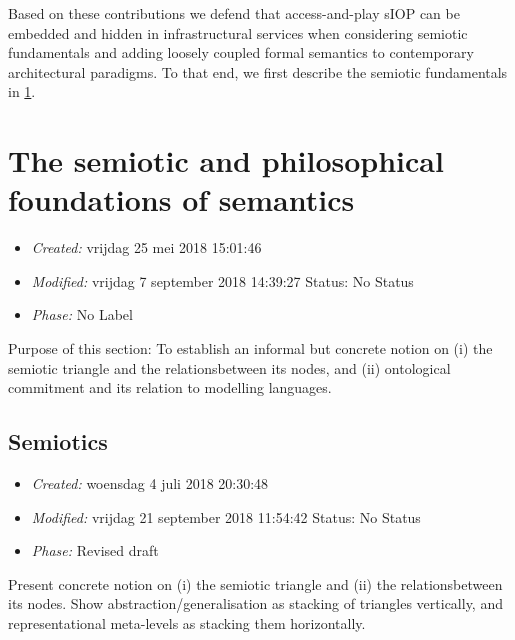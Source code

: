 \documentclass[a4paper,11pt,oneside,oldfontcommands]{memoir}
\newcounter{para}
\theoremstyle{definition}
\theoremstyle{break}		%
\numberwithin{equation}{chapter}
\numberwithin{figure}{chapter}
\begin{document}
Based on these contributions we defend that access-and-play sIOP can be
embedded and hidden in infrastructural services when considering
semiotic fundamentals and adding loosely coupled formal semantics to
contemporary architectural paradigms. To that end, we first describe the
semiotic fundamentals in
\cref{the-semiotic-and-philosophical-foundations-of-semantics}.

\hypertarget{the-semiotic-and-philosophical-foundations-of-semantics}{%
\chapter{The semiotic and philosophical foundations of
semantics}\label{the-semiotic-and-philosophical-foundations-of-semantics}}

\begin{itemize}
\tightlist
\item
  \emph{Created:} vrijdag 25 mei 2018 15:01:46
\item
  \emph{Modified:} vrijdag 7 september 2018 14:39:27 Status: No Status
\item
  \emph{Phase:} No Label
\end{itemize}

\begin{synopsis}
Purpose of this section: To establish an informal but concrete notion on (i) the semiotic triangle and the relationsbetween its nodes, and (ii) ontological commitment and its relation to modelling languages.

\end{synopsis}

\hypertarget{semiotics}{%
\section{Semiotics}\label{semiotics}}

\begin{itemize}
\tightlist
\item
  \emph{Created:} woensdag 4 juli 2018 20:30:48
\item
  \emph{Modified:} vrijdag 21 september 2018 11:54:42 Status: No Status
\item
  \emph{Phase:} Revised draft
\end{itemize}

\begin{synopsis}
Present concrete notion on (i) the semiotic triangle and (ii) the relationsbetween its nodes.
Show abstraction/generalisation as stacking of triangles vertically, and representational meta-levels as stacking them horizontally.

\end{synopsis}
\end{document}
